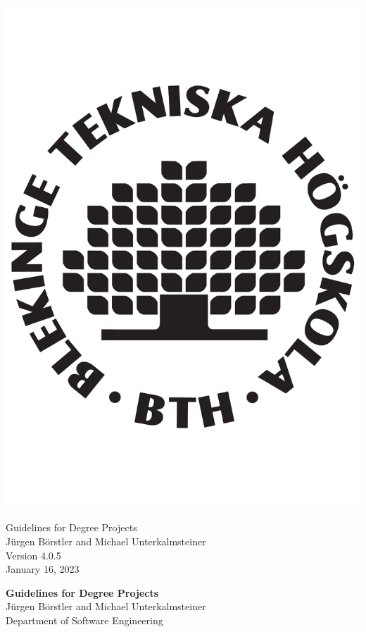 \documentclass[a4paper,12pt]{book}
\newcommand\theVersion{4.0.5} %
\newcommand\theDate{January 16, 2023} %
\begin{document}
\begin{titlepage}
\vspace*{2cm}
\begin{center}
\includegraphics[scale=0.2]{black_BTH_CMYK}
\end{center}
\vspace*{1cm}
\begin{center}
{\Large Guidelines for Degree Projects}\\[1cm]
{Jürgen Börstler and Michael Unterkalmsteiner}\\[3cm]
Version \theVersion \\[2mm]   %
{\theDate}
\end{center}
\newpage

\thispagestyle{empty}
\vspace*{3cm}
\begin{center}
{\normalsize \textbf{Guidelines for Degree Projects}}\\[3cm]
{Jürgen Börstler and Michael Unterkalmsteiner\\[0.3cm]Department of Software Engineering}\\
\end{center}
\end{titlepage}
\end{document}
